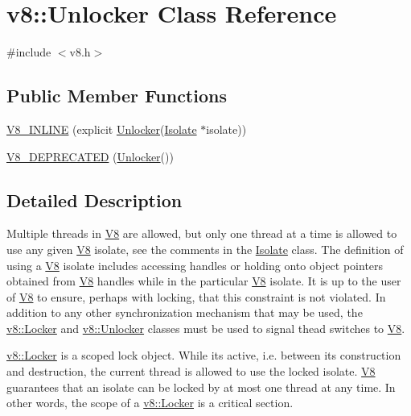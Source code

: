\hypertarget{classv8_1_1_unlocker}{}\section{v8\+:\+:Unlocker Class Reference}
\label{classv8_1_1_unlocker}


{\ttfamily \#include $<$v8.\+h$>$}

\subsection*{Public Member Functions}
\begin{DoxyCompactItemize}
\item 
\hyperlink{classv8_1_1_unlocker_a2312d3473041b9a79cc160e72140f0e8}{V8\+\_\+\+I\+N\+L\+I\+N\+E} (explicit \hyperlink{classv8_1_1_unlocker}{Unlocker}(\hyperlink{classv8_1_1_isolate}{Isolate} $\ast$isolate))
\item 
\hyperlink{classv8_1_1_unlocker_a060ae0d2ccb66234444865b1676abfdd}{V8\+\_\+\+D\+E\+P\+R\+E\+C\+A\+T\+E\+D} (\hyperlink{classv8_1_1_unlocker}{Unlocker}())
\end{DoxyCompactItemize}


\subsection{Detailed Description}
Multiple threads in \hyperlink{classv8_1_1_v8}{V8} are allowed, but only one thread at a time is allowed to use any given \hyperlink{classv8_1_1_v8}{V8} isolate, see the comments in the \hyperlink{classv8_1_1_isolate}{Isolate} class. The definition of \textquotesingle{}using a \hyperlink{classv8_1_1_v8}{V8} isolate\textquotesingle{} includes accessing handles or holding onto object pointers obtained from \hyperlink{classv8_1_1_v8}{V8} handles while in the particular \hyperlink{classv8_1_1_v8}{V8} isolate. It is up to the user of \hyperlink{classv8_1_1_v8}{V8} to ensure, perhaps with locking, that this constraint is not violated. In addition to any other synchronization mechanism that may be used, the \hyperlink{classv8_1_1_locker}{v8\+::\+Locker} and \hyperlink{classv8_1_1_unlocker}{v8\+::\+Unlocker} classes must be used to signal thead switches to \hyperlink{classv8_1_1_v8}{V8}.

\hyperlink{classv8_1_1_locker}{v8\+::\+Locker} is a scoped lock object. While it\textquotesingle{}s active, i.\+e. between its construction and destruction, the current thread is allowed to use the locked isolate. \hyperlink{classv8_1_1_v8}{V8} guarantees that an isolate can be locked by at most one thread at any time. In other words, the scope of a \hyperlink{classv8_1_1_locker}{v8\+::\+Locker} is a critical section.

